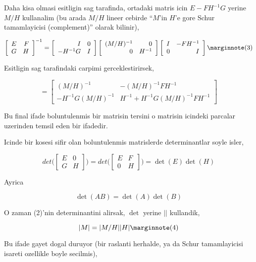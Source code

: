 \documentclass[12pt,fleqn]{article}\usepackage{../common}
\begin{document}
Daha kisa olmasi esitligin sag tarafinda, ortadaki matris icin
$E-FH^{-1}G$ yerine $M/H$ kullanalim (bu arada $M/H$ lineer cebirde ``$M$'in
$H$'e gore Schur tamamlayicisi (complement)'' olarak bilinir),

\[ 
\left[\begin{array}{rr}
E & F \\
G & H
\end{array}\right]^{-1}
=
\left[\begin{array}{rr}
I & 0 \\
-H^{-1}G & I
\end{array}\right] 
\left[\begin{array}{rr}
(M/H)^{-1} & 0 \\
0 & H^{-1}
\end{array}\right]
\left[\begin{array}{rr}
I & -FH^{-1} \\
0 & I
\end{array}\right] 
\mlabel{3}
 \]

Esitligin sag tarafindaki carpimi gerceklestirirsek, 

\[ =
\left[\begin{array}{rr}
(M/H)^{-1} & -(M/H)^{-1}FH^{-1} \\
-H^{-1}G(M/H)^{-1} & H^{-1}+H^{-1}G(M/H)^{-1}FH^{-1} 
\end{array}\right]
 \]

Bu final ifade boluntulenmis bir matrisin tersini o matrisin icindeki parcalar
uzerinden temsil eden bir ifadedir. 

Icinde bir kosesi sifir olan boluntulenmis matrislerde determinantlar soyle
isler,

\[ 
det \bigg(
\left[\begin{array}{rr}
E & 0 \\
G & H
\end{array}\right]
\bigg) 
= 
det \bigg(
\left[\begin{array}{rr}
E & F \\
0 & H
\end{array}\right] 
\bigg) =
\det(E)\det(H)
 \]

Ayrica 

\[ \det(AB) = \det(A)\det(B) \]

O zaman (2)'nin determinantini alirsak, $\det$ yerine $||$ kullandik, 

\[ |M| = |M/H||H| 
\mlabel{4}
\]

Bu ifade gayet dogal duruyor (bir raslanti herhalde, ya da Schur tamamlayicisi 
isareti ozellikle boyle secilmis),
\end{document}
